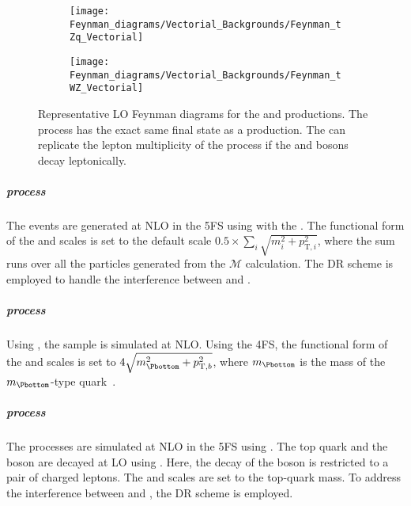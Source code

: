 \begin{figure}[h]
\centering
\begin{subfigure}[b]{0.47\textwidth}
   \texttt{[image: Feynman\_diagrams/Vectorial\_Backgrounds/Feynman\_tZq\_Vectorial]}
   \caption{\tZq}
   \label{fig:tHq:Backgrounds:Feynman_Diboson:tZq}
\end{subfigure}
\begin{subfigure}[b]{0.52\textwidth}
   \texttt{[image: Feynman\_diagrams/Vectorial\_Backgrounds/Feynman\_tWZ\_Vectorial]}
   \caption{\tWZ}
   \label{fig:tHq:Backgrounds:Feynman_Diboson:tWZ}
\end{subfigure}
\caption{Representative LO Feynman diagrams for the \tZq and \tWZ productions.
The \tZq process has the exact same final state as a \tHq production.
The \tWZ can replicate the lepton multiplicity of the \tHq process if 
the \PW and \PZ bosons decay leptonically.} %
\label{fig:tHq:Backgrounds:Feynman_tX}
\end{figure}

\subparagraph{\tHW{} process}
The \tHW events are generated at NLO in the 5FS using \MGNLO[2.8.1]
with the \NNPDF[3.0nlo]. %
The functional form of the \muR and \muF scales is set to the
default scale \(0.5\times \sum_i \sqrt{m^2_i+p^2_{\text{T},i}}\), where the sum runs over
all the particles generated from the $\mathcal{M}$ calculation.
The DR scheme is employed to handle the interference
between \tHW{} and \ttH.


\subparagraph{\tZq process}
Using \MGNLO[2.3.3], the \tZq sample is simulated at NLO. %
Using the 4FS,  the functional form of the \muR and \muF scales
is set to $4\sqrt{m_{\Pbottom}^2+ p^{2}_{\text{T},b}}$, where $m_{\Pbottom}$ is the mass of
the $m_{\Pbottom}$-type quark~\cite{Frederix:2012dh}.

\subparagraph{\tWZ process}
The \tWZ processes are simulated at NLO in the 5FS using \MGNLO[2.3.3]. %
The top quark and the \PZ boson are decayed at LO using \MADSPIN. Here, the decay 
of the \PZ boson is restricted to a pair of charged leptons.
The \muR and \muF scales are set to the top-quark mass.
To address the  interference between \tWZ and \ttZ, the DR scheme is employed.

